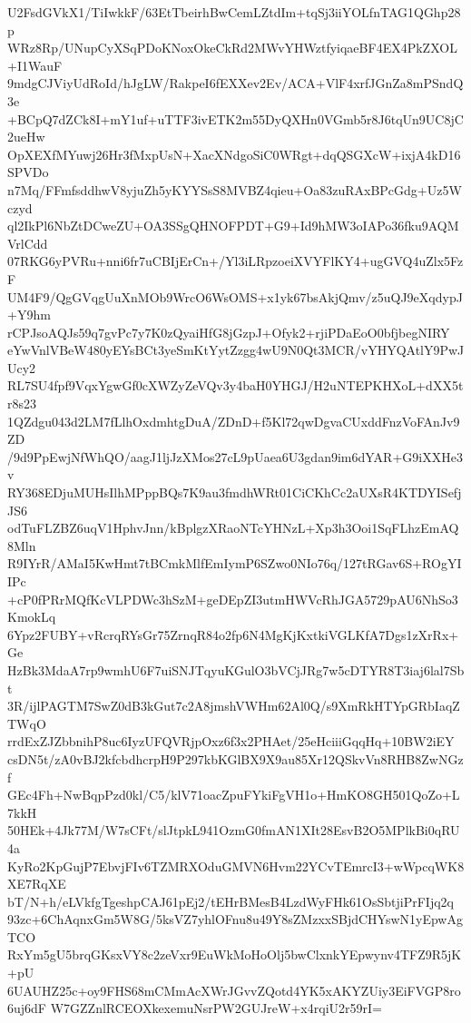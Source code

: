 U2FsdGVkX1/TiIwkkF/63EtTbeirhBwCemLZtdIm+tqSj3iiYOLfnTAG1QGhp28p
WRz8Rp/UNupCyXSqPDoKNoxOkeCkRd2MWvYHWztfyiqaeBF4EX4PkZXOL+I1WauF
9mdgCJViyUdRoId/hJgLW/RakpeI6fEXXev2Ev/ACA+VlF4xrfJGnZa8mPSndQ3e
+BCpQ7dZCk8I+mY1uf+uTTF3ivETK2m55DyQXHn0VGmb5r8J6tqUn9UC8jC2ueHw
OpXEXfMYuwj26Hr3fMxpUsN+XacXNdgoSiC0WRgt+dqQSGXcW+ixjA4kD16SPVDo
n7Mq/FFmfsddhwV8yjuZh5yKYYSsS8MVBZ4qieu+Oa83zuRAxBPcGdg+Uz5Wczyd
ql2IkPl6NbZtDCweZU+OA3SSgQHNOFPDT+G9+Id9hMW3oIAPo36fku9AQMVrlCdd
07RKG6yPVRu+nni6fr7uCBIjErCn+/Yl3iLRpzoeiXVYFlKY4+ugGVQ4uZlx5FzF
UM4F9/QgGVqgUuXnMOb9WrcO6WsOMS+x1yk67bsAkjQmv/z5uQJ9eXqdypJ+Y9hm
rCPJsoAQJs59q7gvPc7y7K0zQyaiHfG8jGzpJ+Ofyk2+rjiPDaEoO0bfjbegNIRY
eYwVnlVBeW480yEYsBCt3yeSmKtYytZzgg4wU9N0Qt3MCR/vYHYQAtlY9PwJUcy2
RL7SU4fpf9VqxYgwGf0cXWZyZeVQv3y4baH0YHGJ/H2uNTEPKHXoL+dXX5tr8s23
1QZdgu043d2LM7fLlhOxdmhtgDuA/ZDnD+f5Kl72qwDgvaCUxddFnzVoFAnJv9ZD
/9d9PpEwjNfWhQO/aagJ1ljJzXMos27cL9pUaea6U3gdan9im6dYAR+G9iXXHe3v
RY368EDjuMUHsIlhMPppBQs7K9au3fmdhWRt01CiCKhCc2aUXsR4KTDYISefjJS6
odTuFLZBZ6uqV1HphvJnn/kBplgzXRaoNTcYHNzL+Xp3h3Ooi1SqFLhzEmAQ8Mln
R9IYrR/AMaI5KwHmt7tBCmkMlfEmIymP6SZwo0NIo76q/127tRGav6S+ROgYIIPc
+cP0fPRrMQfKcVLPDWc3hSzM+geDEpZI3utmHWVcRhJGA5729pAU6NhSo3KmokLq
6Ypz2FUBY+vRcrqRYsGr75ZrnqR84o2fp6N4MgKjKxtkiVGLKfA7Dgs1zXrRx+Ge
HzBk3MdaA7rp9wmhU6F7uiSNJTqyuKGulO3bVCjJRg7w5cDTYR8T3iaj6lal7Sbt
3R/ijlPAGTM7SwZ0dB3kGut7c2A8jmshVWHm62Al0Q/s9XmRkHTYpGRbIaqZTWqO
rrdExZJZbbnihP8uc6IyzUFQVRjpOxz6f3x2PHAet/25eHciiiGqqHq+10BW2iEY
csDN5t/zA0vBJ2kfcbdhcrpH9P297kbKGlBX9X9au85Xr12QSkvVn8RHB8ZwNGzf
GEc4Fh+NwBqpPzd0kl/C5/klV71oacZpuFYkiFgVH1o+HmKO8GH501QoZo+L7kkH
50HEk+4Jk77M/W7sCFt/slJtpkL941OzmG0fmAN1XIt28EsvB2O5MPlkBi0qRU4a
KyRo2KpGujP7EbvjFIv6TZMRXOduGMVN6Hvm22YCvTEmrcI3+wWpcqWK8XE7RqXE
bT/N+h/eLVkfgTgeshpCAJ61pEj2/tEHrBMesB4LzdWyFHk61OsSbtjiPrFIjq2q
93zc+6ChAqnxGm5W8G/5ksVZ7yhlOFnu8u49Y8sZMzxxSBjdCHYswN1yEpwAgTCO
RxYm5gU5brqGKsxVY8c2zeVxr9EuWkMoHoOlj5bwClxnkYEpwynv4TFZ9R5jK+pU
6UAUHZ25c+oy9FHS68mCMmAcXWrJGvvZQotd4YK5xAKYZUiy3EiFVGP8ro6uj6dF
W7GZZnlRCEOXkexemuNsrPW2GUJreW+x4rqiU2r59rI=
